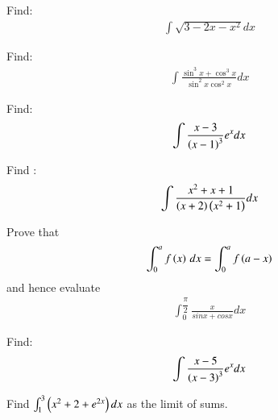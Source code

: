 \item Find:\begin{align*}\int\sqrt{3-2x-x^2}dx\end{align*}
\item Find:
\begin{align*}
\int \frac{\sin^3{x}+\cos^3{x}}{\sin^2{x}\cos^2{x}} dx
\end{align*}
\item Find:
\begin{align*}
\int \frac{x-3}{\left(x-1\right)^3} e^x  dx
\end{align*}
\item Find :
\begin{align*}
\int \frac{x^2+x+1}{\left(x+2\right)\left(x^2+1\right)}dx
\end{align*}
\item Prove that
\begin{align*}
 \int_{0}^{a} f\left(x\right) \,dx = \int_{0}^{a} f\left(a-x\right) 
\end{align*}
and hence evaluate
\begin{align*}
\int_{0}^{\dfrac{\pi}{2}} \frac{x}{sinx + cosx}dx
\end{align*}
\item Find:
\begin{align*}
\int \frac{x-5}{\left(x-3\right)^3} e^x dx
\end{align*}
 \item Find $\int_{1}^{3}\left(x^2+2+e^{2x}\right)dx$  as the limit of sums.


